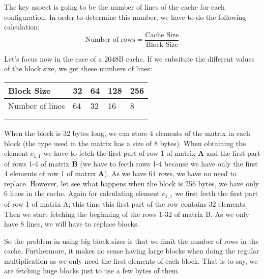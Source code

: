 \documentclass{article}
\begin{document}
The key aspect is going to be the number of lines of the cache for each configuration. In order to determine this number, we have to do the following calculation: 
\[
\text{Number of rows} = \frac{\text{Cache Size}}{\text{Block Size}}
\]

Let's focus now in the case of a 2048B cache. If we subsitute the different values of the block size, we get these numbers of lines:

{
\begin{table}[!ht]
    \centering
    \begin{tabular}{lllll}
    \hline
    \multicolumn{1}{|l|}{Block Size}      & \multicolumn{1}{l|}{32} & \multicolumn{1}{l|}{64} & \multicolumn{1}{l|}{128} & \multicolumn{1}{l|}{256} \\ \hline
    \multicolumn{1}{|l|}{Number of lines} & \multicolumn{1}{l|}{64} & \multicolumn{1}{l|}{32} & \multicolumn{1}{l|}{16}  & \multicolumn{1}{l|}{8}   \\ \hline
                                          &                         &                         &                          &                          \\
                                          &                         &                         &                          &                         
    \end{tabular}
\end{table}
}


When the block is 32 bytes long, we can store 4 elements of the matrix in each block (the type used in the matrix has a size of 8 bytes). When obtaining the element $c_{1,1}$ we have to fetch the first part of row 1 of matrix $\mathbf{A}$ and the first part of rows 1-4 of matrix $\mathbf{B}$ (we have to fecth rows 1-4 because we have only the first 4 elements of row 1 of matrix $\mathbf{A}$). As we have 64 rows, we have no need to replace. However, let see what happens when the block is 256 bytes, we have only 6 lines in the cache. Again for calculating element $c_{1,1}$ we first fecth the first part of row 1 of matrix A; this time this first part of the row contains 32 elements. Then we start fetching the beginning of the rows 1-32 of matrix B. As we only have 8 lines, we will have to replace blocks. 

So the problem in using big block sizes is that we limit the number of rows in the cache. Furthermore, it makes no sense having large blocks when doing the regular multiplication as we only need the first elements of each block. That is to say, we are fetching huge blocks just to use a few bytes of them.
\end{document}
